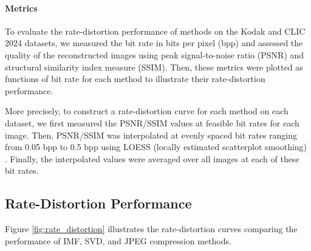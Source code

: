 \paragraph{Metrics}
To evaluate the rate-distortion performance of methods on the Kodak and CLIC 2024 datasets, we measured the bit rate in bits per pixel (bpp) and assessed the quality of the reconstructed images using peak signal-to-noise ratio (PSNR) and structural similarity index measure (SSIM). Then, these metrics were plotted as functions of bit rate for each method to illustrate their rate-distortion performance.

More precisely, to construct a rate-distortion curve for each method on each dataset, we first measured the PSNR/SSIM values at feasible bit rates for each image. Then, PSNR/SSIM was interpolated at evenly spaced bit rates ranging from 0.05 bpp to 0.5 bpp using LOESS (locally estimated scatterplot smoothing) \cite{cleveland1988locally}. Finally, the interpolated values were averaged over all images at each of these bit rates.


\subsection{Rate-Distortion Performance} \label{sec:rate_distortion_performance}

Figure \ref{fig:rate_distortion} illustrates the rate-distortion curves comparing the performance of IMF, SVD, and JPEG compression methods.

